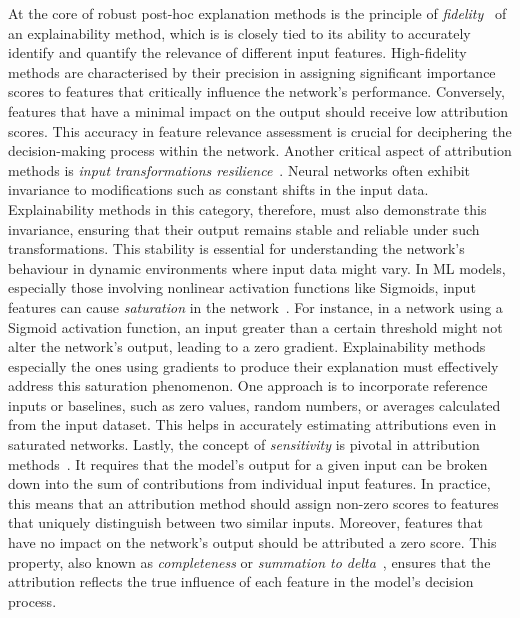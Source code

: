 At the core of robust post-hoc explanation methods is the principle of \emph{fidelity}~\cite{TomsettHCGP20} of an explainability method, which is is closely tied to its ability to accurately identify and quantify the relevance of different input features. High-fidelity methods are characterised by their precision in assigning significant importance scores to features that critically influence the network's performance. Conversely, features that have a minimal impact on the output should receive low attribution scores. This accuracy in feature relevance assessment is crucial for deciphering the decision-making process within the network. Another critical aspect of attribution methods is \emph{input transformations resilience}~\cite{KindermansHAASDEK19, 11700}. Neural networks often exhibit invariance to modifications such as constant shifts in the input data. Explainability methods in this category, therefore, must also demonstrate this invariance, ensuring that their output remains stable and reliable under such transformations. This stability is essential for understanding the network's behaviour in dynamic environments where input data might vary. In ML models, especially those involving nonlinear activation functions like Sigmoids, input features can cause \emph{saturation} in the network~\cite{SundararajanTY17}. For instance, in a network using a Sigmoid activation function, an input greater than a certain threshold might not alter the network's output, leading to a zero gradient. Explainability methods especially the ones using gradients to produce their explanation must effectively address this saturation phenomenon. One approach is to incorporate reference inputs or baselines, such as zero values, random numbers, or averages calculated from the input dataset. This helps in accurately estimating attributions even in saturated networks. Lastly, the concept of \emph{sensitivity} is pivotal in attribution methods~\cite{AnconaCOG19, 11700}. It requires that the model's output for a given input can be broken down into the sum of contributions from individual input features. In practice, this means that an attribution method should assign non-zero scores to features that uniquely distinguish between two similar inputs. Moreover, features that have no impact on the network's output should be attributed a zero score. This property, also known as \emph{completeness} or \emph{summation to delta}~\cite{SundararajanTY17, ShrikumarGK17}, ensures that the attribution reflects the true influence of each feature in the model's decision process.


